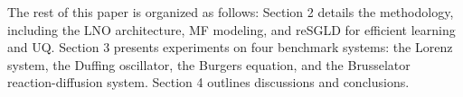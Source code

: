 The rest of this paper is organized as follows: Section 2 details the methodology, including the LNO architecture, MF modeling, and reSGLD for efficient learning and UQ. Section 3 presents experiments on four benchmark systems: the Lorenz system, the Duffing oscillator, the Burgers equation, and the Brusselator reaction-diffusion system. Section 4 outlines discussions and conclusions.
